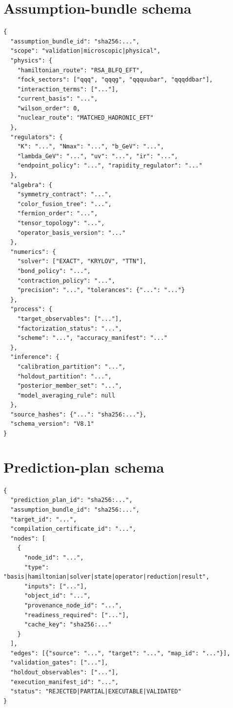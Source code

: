 \documentclass[11pt]{article}
\begin{document}
\appendix

\section{Assumption-bundle schema}
\label{app:assumption-schema}

\begin{verbatim}
{
  "assumption_bundle_id": "sha256:...",
  "scope": "validation|microscopic|physical",
  "physics": {
    "hamiltonian_route": "RSA_BLFQ_EFT",
    "fock_sectors": ["qqq", "qqqg", "qqquubar", "qqqddbar"],
    "interaction_terms": ["..."],
    "current_basis": "...",
    "wilson_order": 0,
    "nuclear_route": "MATCHED_HADRONIC_EFT"
  },
  "regulators": {
    "K": "...", "Nmax": "...", "b_GeV": "...",
    "lambda_GeV": "...", "uv": "...", "ir": "...",
    "endpoint_policy": "...", "rapidity_regulator": "..."
  },
  "algebra": {
    "symmetry_contract": "...",
    "color_fusion_tree": "...",
    "fermion_order": "...",
    "tensor_topology": "...",
    "operator_basis_version": "..."
  },
  "numerics": {
    "solver": ["EXACT", "KRYLOV", "TTN"],
    "bond_policy": "...",
    "contraction_policy": "...",
    "precision": "...", "tolerances": {"...": "..."}
  },
  "process": {
    "target_observables": ["..."],
    "factorization_status": "...",
    "scheme": "...", "accuracy_manifest": "..."
  },
  "inference": {
    "calibration_partition": "...",
    "holdout_partition": "...",
    "posterior_member_set": "...",
    "model_averaging_rule": null
  },
  "source_hashes": {"...": "sha256:..."},
  "schema_version": "V8.1"
}
\end{verbatim}

\section{Prediction-plan schema}
\label{app:plan-schema}

\begin{verbatim}
{
  "prediction_plan_id": "sha256:...",
  "assumption_bundle_id": "sha256:...",
  "target_id": "...",
  "compilation_certificate_id": "...",
  "nodes": [
    {
      "node_id": "...",
      "type": "basis|hamiltonian|solver|state|operator|reduction|result",
      "inputs": ["..."],
      "object_id": "...",
      "provenance_node_id": "...",
      "readiness_required": ["..."],
      "cache_key": "sha256:..."
    }
  ],
  "edges": [{"source": "...", "target": "...", "map_id": "..."}],
  "validation_gates": ["..."],
  "holdout_observables": ["..."],
  "execution_manifest_id": "...",
  "status": "REJECTED|PARTIAL|EXECUTABLE|VALIDATED"
}
\end{verbatim}
\end{document}
